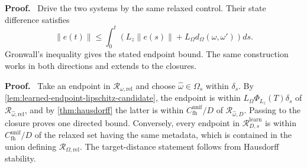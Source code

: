 \documentclass[twoside,11pt]{article}
\renewenvironment{proof}[1][Proof]{\par\noindent\textbf{#1.}\ }{\hfill\BlackBox\par\medskip}
\newcommand{\Rel}{\mathrm{rel}}
\newcommand{\dist}{\operatorname{dist}}
\newcommand{\norm}[1]{\left\lVert #1\right\rVert}
\newcommand{\RR}{\mathscr{R}}
\newcommand{\dH}{d_{\mathrm H}}
\begin{document}

\begin{proof}
Drive the two systems by the same relaxed control.  Their state difference
satisfies
\[
  \norm{e(t)}
  \le\int_0^t\left(L_z\norm{e(s)}
        +L_\Omega d_\Omega(\omega,\omega')\right)ds.
\]
Gronwall's inequality gives the stated endpoint bound.  The same construction
works in both directions and extends to the closures.
\end{proof}


\begin{proof}
Take an endpoint in $\RR_{\omega,\Rel}$ and choose
$\widehat\omega\in\Omega_s$ within $\delta_s$.  By
\cref{lem:learned-endpoint-lipschitz-candidate}, the endpoint is within
$L_\Omega\Phi_{L_z}(T)\delta_s$ of $\RR_{\widehat\omega,\Rel}$, and by
\cref{thm:hausdorff} the latter is within
$C_{\mathrm{fh}}^{\mathrm{unif}}/D$ of
$\RR_{\widehat\omega,D}$.  Passing to the closure proves one directed bound.
Conversely, every endpoint in $\RR_{D,s}^{\mathrm{learn}}$ is within
$C_{\mathrm{fh}}^{\mathrm{unif}}/D$ of the relaxed set having the same
metadata, which is contained in the union defining
$\RR_{\Omega,\Rel}$.  The target-distance statement follows from Hausdorff
stability.
\end{proof}
\end{document}
